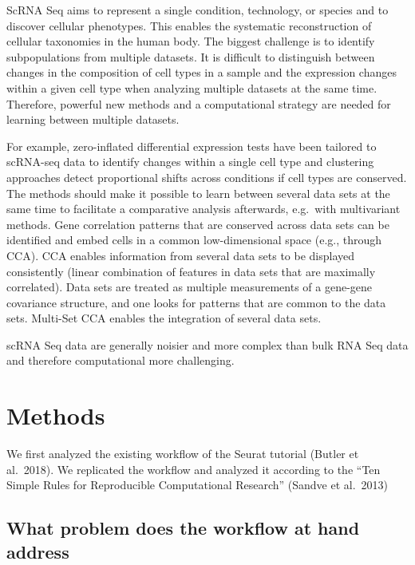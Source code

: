 \documentclass[a4paper, 10pt]{scrartcl}
\begin{document}
ScRNA Seq aims to represent a single condition, technology, or species
and to discover cellular phenotypes. This enables the systematic
reconstruction of cellular taxonomies in the human body. The biggest
challenge is to identify subpopulations from multiple datasets. It is
difficult to distinguish between changes in the composition of cell
types in a sample and the expression changes within a given cell type
when analyzing multiple datasets at the same time. Therefore, powerful
new methods and a computational strategy are needed for learning between
multiple datasets.

For example, zero-inflated differential expression tests have been
tailored to scRNA-seq data to identify changes within a single cell type
and clustering approaches detect proportional shifts across conditions
if cell types are conserved. The methods should make it possible to
learn between several data sets at the same time to facilitate a
comparative analysis afterwards, e.g.~with multivariant methods. Gene
correlation patterns that are conserved across data sets can be
identified and embed cells in a common low-dimensional space (e.g.,
through CCA). CCA enables information from several data sets to be
displayed consistently (linear combination of features in data sets that
are maximally correlated). Data sets are treated as multiple
measurements of a gene-gene covariance structure, and one looks for
patterns that are common to the data sets. Multi-Set CCA enables the
integration of several data sets.

scRNA Seq data are generally noisier and more complex than bulk RNA Seq
data and therefore computational more challenging.

\hypertarget{methods}{%
\section{Methods}\label{methods}}

We first analyzed the existing workflow of the Seurat tutorial (Butler
et al.~2018). We replicated the workflow and analyzed it according to
the ``Ten Simple Rules for Reproducible Computational Research'' (Sandve
et al.~2013)

\hypertarget{what-problem-does-the-workflow-at-hand-address}{%
\subsection{What problem does the workflow at hand
address}\label{what-problem-does-the-workflow-at-hand-address}}
\end{document}
